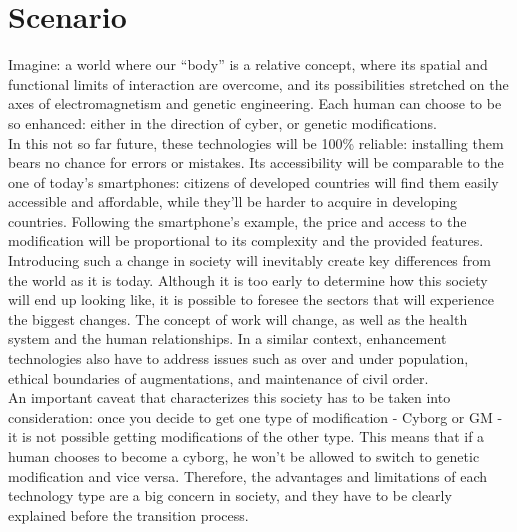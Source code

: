 
\chapter*{Scenario} %
\label{cha:scenario}

Imagine: a world where our “body” is a relative concept, where its spatial and functional limits of interaction are overcome, and its possibilities stretched on the axes of electromagnetism and genetic engineering. Each human can choose to be so enhanced: either in the direction of cyber, or genetic modifications.\\ 

In this not so far future, these technologies will be 100\% reliable: installing them bears no chance for errors or mistakes. Its accessibility will be comparable to the one of today’s smartphones: citizens of developed countries will find them easily accessible and affordable, while they’ll be harder to acquire in developing countries. Following the smartphone’s example, the price and access to the modification will be proportional to its complexity and the provided features.\\

Introducing such a change in society will inevitably create key differences from the world as it is today. Although it is too early to determine how this society will end up looking like, it is possible to foresee the sectors that will experience the biggest changes. The concept of work will change, as well as the health system and the human relationships. In a similar context, enhancement technologies also have to address issues such as over and under population, ethical boundaries of augmentations, and maintenance of civil order.\\

An important caveat that characterizes this society has to be taken into consideration: once you decide to get one type of modification - Cyborg or GM - it is not possible getting modifications of the other type. This means that if a human chooses to become a cyborg, he won’t be allowed to switch to genetic modification and vice versa. Therefore, the advantages and limitations of each technology type are a big concern in society, and they have to be clearly explained before the transition process.\\

